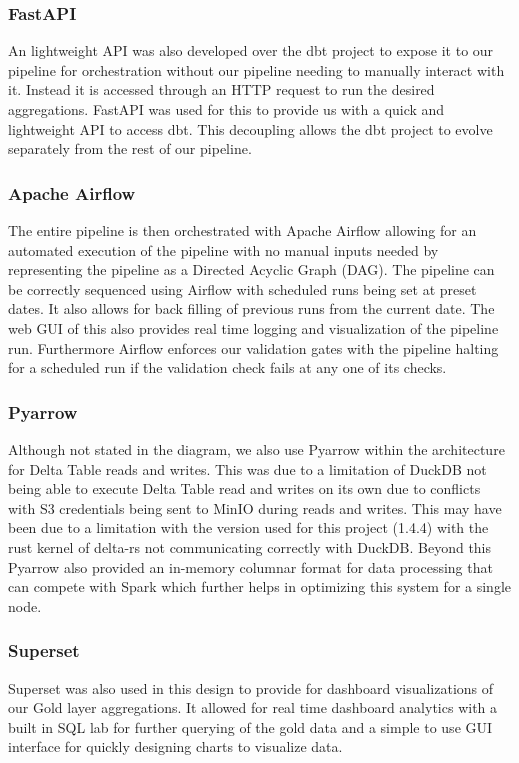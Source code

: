 \documentclass[conference]{IEEEtran}
\begin{document}
\subsubsection{FastAPI}
An lightweight API was also developed over the dbt project to expose it to our pipeline for orchestration without our pipeline needing to manually interact with it. Instead it is accessed through an HTTP request to run the desired aggregations. FastAPI \cite{fastapi_docs} was used for this to provide us with a quick and lightweight API to access dbt. This decoupling allows the dbt project to evolve separately from the rest of our pipeline.

\subsubsection{Apache Airflow}
The entire pipeline is then orchestrated with Apache Airflow \cite{airflow_docs} allowing for an automated execution of the pipeline with no manual inputs needed by representing the pipeline as a Directed Acyclic Graph (DAG). The pipeline can be correctly sequenced using Airflow with scheduled runs being set at preset dates. It also allows for back filling of previous runs from the current date. The web GUI of this also provides real time logging and visualization of the pipeline run. Furthermore Airflow enforces our validation gates with the pipeline halting for a scheduled run if the validation check fails at any one of its checks.

\subsubsection{Pyarrow}
Although not stated in the diagram, we also use Pyarrow \cite{pyarrow_docs} within the architecture for Delta Table reads and writes. This was due to a limitation of DuckDB not being able to execute Delta Table read and writes on its own due to conflicts with S3 credentials being sent to MinIO during reads and writes. This may have been due to a limitation with the version used for this project (1.4.4) with the rust kernel of delta-rs not communicating correctly with DuckDB. Beyond this Pyarrow also provided an in-memory columnar format for data processing that can compete with Spark which further helps in optimizing this system for a single node.

\subsubsection{Superset}
Superset \cite{superset_docs} was also used in this design to provide for dashboard visualizations of our Gold layer aggregations. It allowed for real time dashboard analytics with a built in SQL lab for further querying of the gold data and a simple to use GUI interface for quickly designing charts to visualize data.
\end{document}
